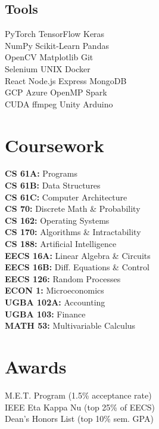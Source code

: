 \documentclass[]{deedy-resume-openfont}
\begin{document}
\begin{minipage}[t]{0.33\textwidth}
\sectionsep
\subsection{Tools}
PyTorch \textbullet{} TensorFlow \textbullet{} Keras \textbullet{} \\
NumPy \textbullet Scikit-Learn  \textbullet{} Pandas \textbullet{} \\
OpenCV \textbullet{}  Matplotlib \textbullet{} Git \textbullet{} \\
Selenium  \textbullet{} UNIX \textbullet{} Docker \textbullet{} \\
React \textbullet{} Node.js \textbullet{}  Express \textbullet{} MongoDB \textbullet{} \\
GCP \textbullet{} Azure \textbullet{} OpenMP \textbullet{} Spark \textbullet{} \\
CUDA \textbullet{} ffmpeg \textbullet{} Unity \textbullet{} Arduino
\sectionsep



\section{Coursework}
{\bf CS 61A:} Programs \\
{\bf CS 61B:} Data Structures \\
{\bf CS 61C:} Computer Architecture \\
{\bf CS 70:} Discrete Math \& Probability \\
{\bf CS 162:} Operating Systems \\
{\bf CS 170:} Algorithms \& Intractability \\
{\bf CS 188:} Artificial Intelligence \\
{\bf EECS 16A:} Linear Algebra \& Circuits \\
{\bf EECS 16B:} Diff. Equations \& Control \\
{\bf EECS 126:}  Random Processes \\
{\bf ECON 1:}  Microeconomics \\
{\bf UGBA 102A:}   Accounting \\
{\bf UGBA 103:}  Finance \\
{\bf MATH 53:}  Multivariable Calculus \\

\sectionsep

\section{Awards}
M.E.T. Program (1.5\% acceptance rate)  \\
IEEE Eta Kappa Nu (top 25\% of EECS) \\
Dean's Honors List (top 10\% sem. GPA) \\
\sectionsep


%
%

\end{minipage} 
\end{document}
